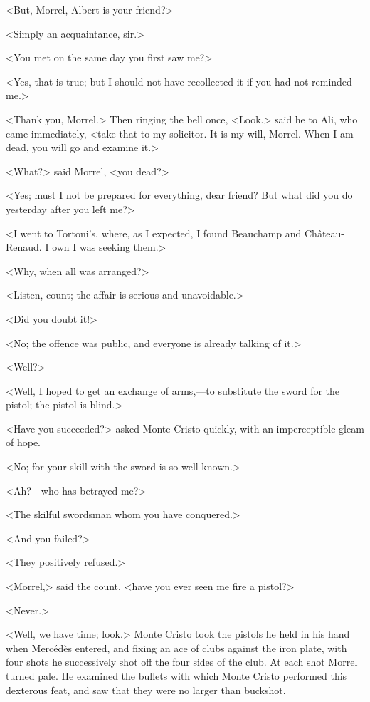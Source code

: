  <But, Morrel, Albert is your friend?> 

 <Simply an acquaintance, sir.> 

 <You met on the same day you first saw me?> 

 <Yes, that is true; but I should not have recollected it if you had not reminded me.> 

 <Thank you, Morrel.> Then ringing the bell once, <Look.> said he to Ali, who came immediately, <take that to my solicitor. It is my will, Morrel. When I am dead, you will go and examine it.> 

 <What?> said Morrel, <you dead?> 

 <Yes; must I not be prepared for everything, dear friend? But what did you do yesterday after you left me?> 

 <I went to Tortoni's, where, as I expected, I found Beauchamp and Château-Renaud. I own I was seeking them.> 

 <Why, when all was arranged?> 

 <Listen, count; the affair is serious and unavoidable.> 

 <Did you doubt it!> 

 <No; the offence was public, and everyone is already talking of it.> 

 <Well?> 

 <Well, I hoped to get an exchange of arms,—to substitute the sword for the pistol; the pistol is blind.> 

 <Have you succeeded?> asked Monte Cristo quickly, with an imperceptible gleam of hope. 

 <No; for your skill with the sword is so well known.> 

 <Ah?—who has betrayed me?> 

 <The skilful swordsman whom you have conquered.> 

 <And you failed?> 

 <They positively refused.> 

 <Morrel,> said the count, <have you ever seen me fire a pistol?> 

 <Never.> 

 <Well, we have time; look.> Monte Cristo took the pistols he held in his hand when Mercédès entered, and fixing an ace of clubs against the iron plate, with four shots he successively shot off the four sides of the club. At each shot Morrel turned pale. He examined the bullets with which Monte Cristo performed this dexterous feat, and saw that they were no larger than buckshot. 

